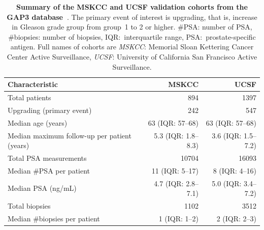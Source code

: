 \begin{table}
\small\sf\centering
\caption{\textbf{Summary of the MSKCC and UCSF validation cohorts from the GAP3 database~\citep{gap3_2018}}. The primary event of interest is upgrading, that is, increase in Gleason grade group from group~1 to 2 or higher. \#PSA: number of PSA, \#biopsies: number of biopsies, IQR:~interquartile range, PSA:~prostate-specific antigen. Full names of cohorts are \textit{MSKCC}: Memorial Sloan Kettering Cancer Center Active Surveillance, \textit{UCSF}: University of California San Francisco Active Surveillance.}
\label{table:gap3_summary_2}
\begin{tabular}{lrr}
\hline
\textbf{Characteristic} & \textbf{MSKCC} & \textbf{UCSF}\\
\hline
Total patients & 894 & 1397 \\
Upgrading (primary event) & 242 & 547\\
\hline
Median age (years) & 63 (IQR: 57--68) & 63 (IQR: 57--68)\\
Median maximum follow-up per patient (years) & 5.3 (IQR: 1.8--8.3) & 3.6 (IQR: 1.5--7.2)\\
Total PSA measurements & 10704 & 16093\\
Median \#PSA per patient & 11 (IQR: 5--17) & 8 (IQR: 4--16)\\
Median PSA (ng/mL) & 4.7 (IQR: 2.8--7.1) & 5.0 (IQR: 3.4--7.2)\\
Total biopsies & 1102 & 3512\\
Median \#biopsies per patient & 1 (IQR: 1--2) & 2 (IQR: 2--3)\\
\hline
\end{tabular}
\end{table}

